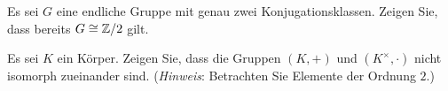 \documentclass[a4paper, 10pt]{scrartcl}
\begin{document}
\begin{question}
  Es sei $G$ eine endliche Gruppe mit genau zwei Konjugationsklassen.
  Zeigen Sie, dass bereits $G \cong \mathbb{Z}/2$ gilt.
\end{question}

\begin{question}
  Es sei $K$ ein Körper.
  Zeigen Sie, dass die Gruppen $(K,+)$ und $(K^\times, \cdot)$ nicht isomorph zueinander sind.
  \newline
  (\emph{Hinweis}:
  Betrachten Sie Elemente der Ordnung $2$.)
\end{question}
\end{document}
